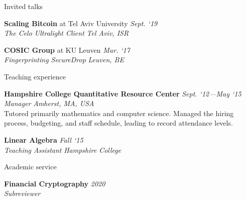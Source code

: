 \documentclass{cv}
\begin{document}
\begin{rSection}{Invited talks}

\textbf{Scaling Bitcoin} at Tel Aviv University \hfill \emph{Sept. `19} \\
\emph{The Celo Ultralight Client} \hfill \emph{Tel Aviv, ISR}

\textbf{COSIC Group} at KU Leuven \hfill \emph{Mar. `17} \\
\emph{Fingerprinting SecureDrop} \hfill \emph{Leuven, BE}

\end{rSection}

\begin{rSection}{Teaching experience}

\textbf{Hampshire College Quantitative Resource Center} \hfill \emph{Sept. `12---May `15} \\
\emph{Manager} \hfill \emph{Amherst, MA, USA} \\
{\small Tutored primarily mathematics and computer science. Managed the hiring process, budgeting, and staff schedule, leading to record attendance levels.}

\textbf{Linear Algebra} \hfill \emph{Fall `15} \\
\emph{Teaching Assistant} \hfill \emph{Hampshire College}

\end{rSection}

\begin{rSection}{Academic service}

\textbf{Financial Cryptography} \hfill \emph{2020} \\
\emph{Subreviewer} \\

\end{rSection}

\end{document}
